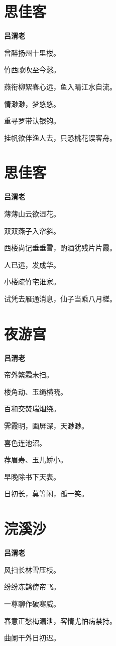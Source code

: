 \documentclass[12pt,a4paper]{ctexbook}
\begin{document}
\section{思佳客}
\textbf{吕渭老}\par\vspace{0.5em}
曾醉扬州十里楼。\par
竹西歌吹至今愁。\par
燕衔柳絮春心远，鱼入晴江水自流。\par
情渺渺，梦悠悠。\par
重寻罗带认银钩。\par
挂帆欲伴渔人去，只恐桃花误客舟。\par

\section{思佳客}
\textbf{吕渭老}\par\vspace{0.5em}
薄薄山云欲湿花。\par
双双燕子入帘斜。\par
西楼尚记垂垂雪，酌酒犹残片片霞。\par
人已远，发成华。\par
小楼疏竹宅谁家。\par
试凭去雁通消息，仙子当乘八月槎。\par

\section{夜游宫}
\textbf{吕渭老}\par\vspace{0.5em}
帘外繁霜未扫。\par
楼角动、玉绳横晓。\par
百和交焚瑞烟绕。\par
霁霞明，画屏深，天渺渺。\par
喜色连池沼。\par
荐眉寿、玉儿娇小。\par
早晚除书下天表。\par
日初长，莫等闲，孤一笑。\par

\section{浣溪沙}
\textbf{吕渭老}\par\vspace{0.5em}
风扫长林雪压枝。\par
纷纷冻鹊傍帘飞。\par
一尊聊作破寒威。\par
春意正愁梅漏泄，客情尤怕病禁持。\par
曲阑干外日初迟。\par
\end{document}
